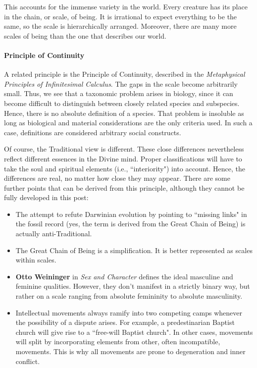 This accounts for the immense variety in the world. Every creature has its place in the chain, or scale, of being. It is irrational to expect everything to be the same, so the scale is hierarchically arranged. Moreover, there are many more scales of being than the one that describes our world.

\paragraph{Principle of Continuity}
A related principle is the Principle of Continuity, described in the \emph{Metaphysical Principles of Infinitesimal Calculus}. The gaps in the scale become arbitrarily small. Thus, we see that a taxonomic problem arises in biology, since it can become difficult to distinguish between closely related species and subspecies. Hence, there is no absolute definition of a species. That problem is insoluble as long as biological and material considerations are the only criteria used. In such a case, definitions are considered arbitrary social constructs.

Of course, the Traditional view is different. These close differences nevertheless reflect different essences in the Divine mind. Proper classifications will have to take the soul and spiritual elements (i.e., ``interiority") into account. Hence, the differences are real, no matter how close they may appear. There are some further points that can be derived from this principle, although they cannot be fully developed in this post:

\begin{itemize}
\item The attempt to refute Darwinian evolution by pointing to ``missing links" in the fossil record (yes, the term is derived from the Great Chain of Being) is actually anti-Traditional. 
\item The Great Chain of Being is a simplification. It is better represented as scales within scales. 
\item \textbf{Otto Weininger} in \emph{Sex and Character} defines the ideal masculine and feminine qualities. However, they don't manifest in a strictly binary way, but rather on a scale ranging from absolute femininity to absolute masculinity. 
\item Intellectual movements always ramify into two competing camps whenever the possibility of a dispute arises. For example, a predestinarian Baptist church will give rise to a ``free-will Baptist church". In other cases, movements will split by incorporating elements from other, often incompatible, movements. This is why all movements are prone to degeneration and inner conflict. 
\end{itemize}

